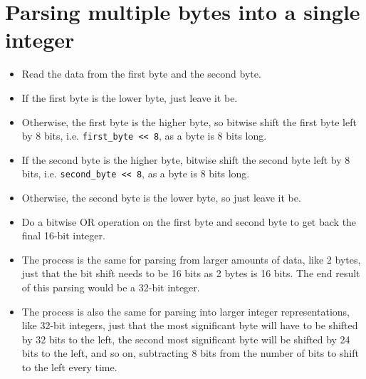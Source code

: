 \documentclass[11pt]{article}
\begin{document}
\section{Parsing multiple bytes into a single integer}
\label{sec:org1891075}
\begin{itemize}
\item Read the data from the first byte and the second byte.
\item If the first byte is the lower byte, just leave it be.
\item Otherwise, the first byte is the higher byte, so bitwise shift the first byte left by 8 bits, i.e. \texttt{first\_byte <{}<{} 8}, as a byte is 8 bits long.
\item If the second byte is the higher byte, bitwise shift the second byte left by 8 bits, i.e. \texttt{second\_byte <{}<{} 8}, as a byte is 8 bits long.
\item Otherwise, the second byte is the lower byte, so just leave it be.
\item Do a bitwise OR operation on the first byte and second byte to get back the final 16-bit integer.
\item The process is the same for parsing from larger amounts of data, like 2 bytes, just that the bit shift needs to be 16 bits as 2 bytes is 16 bits. The end result of this parsing would be a 32-bit integer.
\item The process is also the same for parsing into larger integer representations, like 32-bit integers, just that the most significant byte will have to be shifted by 32 bits to the left, the second most significant byte will be shifted by 24 bits to the left, and so on, subtracting 8 bits from the number of bits to shift to the left every time.
\end{itemize}
\end{document}
